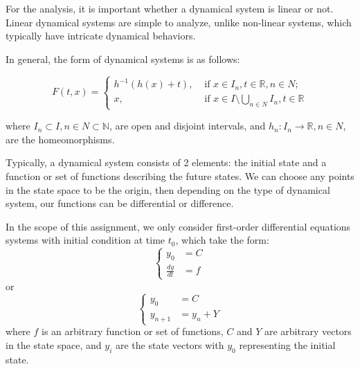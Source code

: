 \documentclass[a4paper]{article}
\numberwithin{equation}{section}
\begin{document}
For the analysis, it is important whether a dynamical system is linear or not.
Linear dynamical systems are simple to analyze, unlike non-linear systems, which typically have intricate dynamical behaviors.

In general, the form of dynamical systems is as follows\cite{sibirsky1975topology}:

\begin{equation*}
  F(t, x) = \begin{cases}
    h^{-1}(h(x) + t), & \text{ if } x \in I_n, t \in \mathbb{R}, n \in N;                     \\
    x,                & \text{ if } x \in I \setminus \bigcup_{n \in N} I_n, t \in \mathbb{R}
  \end{cases}
\end{equation*}

where \(I_n \subset I, n \in N \subset \mathbb{N}\), are open and disjoint intervals, and \(h_n : I_n \rightarrow \mathbb{R}, n \in N\), are the homeomorphisms.

Typically, a dynamical system consists of 2 elements: the initial state and a function or set of functions describing the future states.
We can choose any points in the state space to be the origin, then depending on the type of dynamical system, our functions can be differential or difference.

In the scope of this assignment, we only consider first-order differential equations systems with initial condition at time \(t_0\), which take the form:
\begin{equation*}
  \begin{cases}
    y_0           & = C \\
    \frac{dy}{dt} & = f
  \end{cases}
\end{equation*}
or
\begin{equation*}
  \begin{cases}
    y_0       & = C       \\
    y_{n + 1} & = y_n + Y
  \end{cases}
\end{equation*}
where \(f\) is an arbitrary function or set of functions, \(C\) and \(Y\) are arbitrary vectors in the state space, and \(y_i\) are the state vectors with \(y_0\) representing the initial state.
\end{document}

